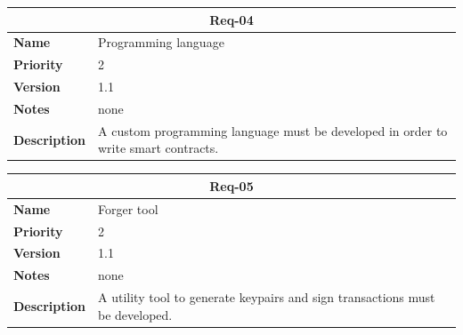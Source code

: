 \documentclass[../documentation.tex]{subfiles}
\begin{document}
\bgroup{}
\def\arraystretch{1.25}
\begin{center}
    \begin{tabular}{ |l|p{9cm}| }
        \hline
        \multicolumn{2}{|c|}{\textbf{Req-04}} \\
        \hline
        \textbf{Name} & Programming language \\
        \hline
        \textbf{Priority} & 2 \\
        \hline
        \textbf{Version} & 1.1 \\
        \hline
        \textbf{Notes} & none \\
        \hline
        \textbf{Description} &A custom programming language must be developed in order to write smart contracts. \\
        \hline
    \end{tabular}
\end{center}
\egroup{}

\bgroup{}
\def\arraystretch{1.25}
\begin{center}
    \begin{tabular}{ |l|p{9cm}| }
        \hline
        \multicolumn{2}{|c|}{\textbf{Req-05}} \\
        \hline
        \textbf{Name} & Forger tool \\
        \hline
        \textbf{Priority} & 2 \\
        \hline
        \textbf{Version} & 1.1 \\
        \hline
        \textbf{Notes} & none \\
        \hline
        \textbf{Description} & A utility tool to generate keypairs and sign transactions must be developed. \\
        \hline
    \end{tabular}
\end{center}
\egroup{}
\end{document}
